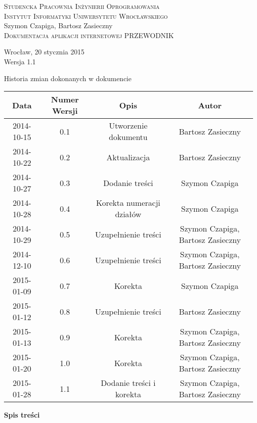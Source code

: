 \documentclass[12pt,a4paper]{report}
\makeatletter
\newcommand*{\toccontents}{\@starttoc{toc}}
\makeatother
\begin{document}
\newcommand{\itab}[1]{\hspace{4em}\rlap{#1}}
\newcommand{\tab}[1]{\hspace{.2\textwidth}\rlap{#1}}

\begin{titlepage}
\begin{center}
\textsc{Studencka Pracownia Inżynierii Oprogramowania}\\[0.5cm]
\textsc{Instytut Informatyki Uniwersytetu Wrocławskiego}\\[8.0cm]

Szymon Czapiga, Bartosz Zasieczny\\[1.0cm]

\LARGE{\textsc{Dokumentacja aplikacji internetowej PRZEWODNIK}}\\[8.5cm]

\begin{normalsize}

Wrocław, 20 stycznia 2015\\[0.5cm]
Wersja 1.1
\end{normalsize}
\end{center}
\end{titlepage}

\begin{table}[h1]
 \itab \textit{Tabela 0.} Historia zmian dokonanych w dokumencie
  \begin{center}
    \begin{tabular}{| c | c | c | c |}
    \hline
    Data & Numer Wersji & Opis & Autor \\
    \hline \hline
    2014-10-15 & 0.1 & Utworzenie dokumentu & Bartosz Zasieczny \\
    \hline
    2014-10-22 & 0.2 & Aktualizacja & Bartosz Zasieczny \\
    \hline
    2014-10-27 & 0.3 & Dodanie treści  & Szymon Czapiga \\
    \hline
    2014-10-28 & 0.4 & Korekta numeracji działów & Szymon Czapiga \\
    \hline
    2014-10-29 & 0.5 & Uzupełnienie treści & Szymon Czapiga, Bartosz Zasieczny \\
    \hline
    2014-12-10 & 0.6 & Uzupełnienie treści & Szymon Czapiga, Bartosz Zasieczny \\
    \hline
    2015-01-09 & 0.7 & Korekta & Szymon Czapiga\\
    \hline
    2015-01-12 & 0.8 & Uzupełnienie treści & Bartosz Zasieczny \\
    \hline
    2015-01-13 & 0.9 & Korekta & Szymon Czapiga, Bartosz Zasieczny \\
    \hline
    2015-01-20 & 1.0 & Korekta & Szymon Czapiga, Bartosz Zasieczny \\
    \hline
    2015-01-28 & 1.1 & Dodanie treści i korekta & Szymon Czapiga, Bartosz Zasieczny \\
    \hline
    \end{tabular}
  \end{center}
\end{table}
\textbf{\large{Spis treści}}\\[0.3cm]
\toccontents
\newpage
\end{document}
